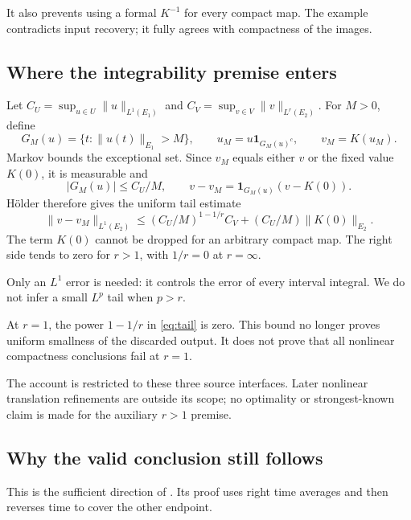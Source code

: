 \documentclass[12pt,reqno]{amsart}
\begin{document}
It also prevents using a formal $K^{-1}$ for every compact map. The example contradicts input recovery; it fully agrees with compactness of the images.
\subsection{Where the integrability premise enters}

Let $C_U=\sup_{u\in U}\|u\|_{L^1(E_1)}$ and $C_V=\sup_{v\in V}\|v\|_{L^r(E_2)}$. For $M>0$, define
\[
G_M(u)=\{t:\|u(t)\|_{E_1}>M\},\qquad
u_M=u\mathbf1_{G_M(u)^c},\qquad v_M=K(u_M).
\]
Markov bounds the exceptional set. Since $v_M$ equals either $v$ or the fixed value $K(0)$, it is measurable and
\[
|G_M(u)|\le C_U/M,\qquad v-v_M=\mathbf1_{G_M(u)}(v-K(0)).
\]
H\"older therefore gives the uniform tail estimate
\begin{equation}\label{eq:tail}
\|v-v_M\|_{L^1(E_2)}
\le (C_U/M)^{1-1/r}C_V+(C_U/M)\|K(0)\|_{E_2}.
\end{equation}
The term $K(0)$ cannot be dropped for an arbitrary compact map. The right side tends to zero for $r>1$, with $1/r=0$ at $r=\infty$.

Only an $L^1$ error is needed: it controls the error of every interval integral. We do not infer a small $L^p$ tail when $p>r$.

At $r=1$, the power $1-1/r$ in \eqref{eq:tail} is zero. This bound no longer proves uniform smallness of the discarded output. It does not prove that all nonlinear compactness conclusions fail at $r=1$.

The account is restricted to these three source interfaces. Later nonlinear translation refinements are outside its scope; no optimality or strongest-known claim is made for the auxiliary $r>1$ premise.
\subsection{Why the valid conclusion still follows}

\begin{lemma}[Simon]\label{lem:criterion}

\end{lemma}

This is the sufficient direction of \cite[Theorem 1, pp.~71--73]{S-simon}. Its proof uses right time averages and then reverses time to cover the other endpoint.
\end{document}
